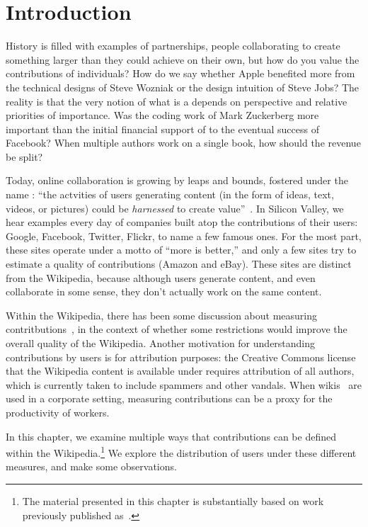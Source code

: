 
\section{Introduction}

History is filled with examples of partnerships, people collaborating
to create something larger than they could achieve on their own,
but how do you value the contributions of individuals?
How do we say whether Apple benefited more from the technical
designs of Steve Wozniak or the design intuition of Steve Jobs?
The reality is that the very notion of what is a 
depends on perspective and relative priorities of importance.
Was the coding work of Mark Zuckerberg more important than
the initial financial support of  to the eventual
success of Facebook?  
When multiple authors work on a single book, how should the
revenue be split?

Today, online collaboration is growing by leaps and bounds,
fostered under the name : ``the actvities of
users generating content (in the form of ideas, text,
videos, or pictures) could be \textit{harnessed} to
create value''~\cite{wiki:Web20}.
In Silicon Valley, we hear examples every day of companies
built atop the contributions of their users:
Google, Facebook, Twitter, Flickr, to name a few famous ones.
For the most part, these sites operate under a motto
of ``more is better,'' and only a few sites try to estimate
a quality of contributions (\eg Amazon and eBay).
These sites are distinct from the Wikipedia, because although
users generate content, and even collaborate in some sense,
they don't actually work on the same content.

Within the Wikipedia, there has been some discussion
about measuring contritbutions~\cite{Wales2005,Swartz2006},
in the context of whether some restrictions would improve
the overall quality of the Wikipedia.
Another motivation for understanding contributions by
users is for attribution purposes: the Creative Commons license
that the Wikipedia content is available under requires attribution
of all authors, which is currently taken to include spammers
and other vandals.
When wikis~\cite{Leuf2001} are used in a corporate setting,
measuring contributions can be a proxy for the productivity
of workers.

In this chapter, we examine multiple ways that contributions
can be defined within the Wikipedia.\footnote{The material
presented in this chapter is substantially based on work
previously published as~\cite{AuthorContrib2008}.}
We explore the distribution of users under these different measures,
and make some observations.

